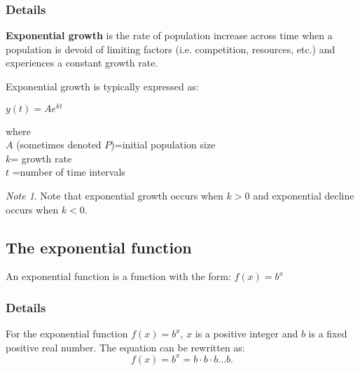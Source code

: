 \documentclass[12pt,a4paper]{article}
\theoremstyle{regla}
\theoremstyle{remark}
\newtheorem{notes}{Note}[section]
\theoremstyle{definition}
\theoremstyle{nonumberbreak}
\begin{document}
\subsubsection{Details}
\begin{defn}
{\bf Exponential growth} is the rate of population increase across time when a population is devoid of limiting factors (i.e. competition, resources, etc.) and experiences a constant growth rate.
\end{defn}

 Exponential growth is typically expressed as:

$y(t)=Ae^{kt}$

where \\
$A$ (sometimes denoted $P$)=initial population size\\
$k$= growth rate\\
$t$ =number of time intervals

\begin{notes}
Note that exponential growth occurs when $k>0$ and exponential decline occurs when $k<0$.
\end {notes}


\subsection{The exponential function}
\begin{fbox}
\begin{minipage}{0.97\textwidth}
An exponential function is a function with the form:
$f(x)=b^x$


\end{minipage}
\end{fbox}
\subsubsection{Details}
For the exponential function $f(x)=b^x$, $x$ is a positive integer and $b$ is a fixed positive real number.  The equation can be rewritten as:
$$f(x)=b^x=b\cdot b \cdot b...b.$$
\end{document}
